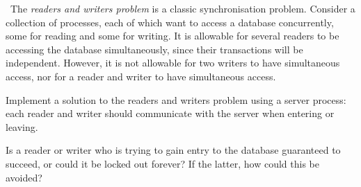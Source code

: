 \begin{nontutequestion}
\Programming\ 
The \emph{readers and writers problem} is a classic synchronisation problem.
Consider a collection of processes, each of which want to access a database
concurrently, some for reading and some for writing.  It is allowable for
several readers to be accessing the database simultaneously, since their
transactions will be independent.  However, it is not allowable for two
writers to have simultaneous access, nor for a reader and writer to have
simultaneous access.

Implement a solution to the readers and writers problem using a server
process: each reader and writer should communicate with the server when
entering or leaving.

Is a reader or writer who is trying to gain entry to the database guaranteed
to succeed, or could it be locked out forever?  If the latter, how could this
be avoided? 
\end{nontutequestion}


